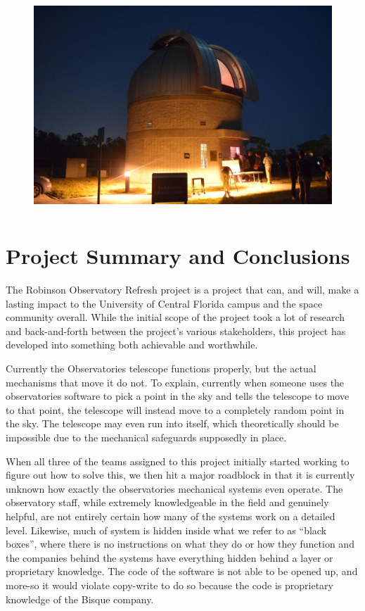 \documentclass[12pt]{article}
\begin{document}
\begin{figure}[h]
	\centering
	\includegraphics[width=0.8\linewidth, height=8.0cm]{tele}
\end{figure}

\section{Project Summary and Conclusions}

The Robinson Observatory Refresh project is a project that can, and will, make a lasting impact to the University of Central Florida campus and the space community overall. While the initial scope of the project took a lot of research and back-and-forth between the project’s various stakeholders, this project has developed into something both achievable and worthwhile.

Currently the Observatories telescope functions properly, but the actual mechanisms that move it do not. To explain, currently when someone uses the observatories software to pick a point in the sky and tells the telescope to move to that point, the telescope will instead move to a completely random point in the sky. The telescope may even run into itself, which theoretically should be impossible due to the mechanical safeguards supposedly in place.

When all three of the teams assigned to this project initially started working to figure out how to solve this, we then hit a major roadblock in that it is currently unknown how exactly the observatories mechanical systems even operate. The observatory staff, while extremely knowledgeable in the field and genuinely helpful, are not entirely certain how many of the systems work on a detailed level. Likewise, much of system is hidden inside what we refer to as “black boxes”, where there is no instructions on what they do or how they function and the companies behind the systems have everything hidden behind a layer or proprietary knowledge. The code of the software is not able to be opened up, and more-so it would violate copy-write to do so because the code is proprietary knowledge of the Bisque company.
\end{document}
